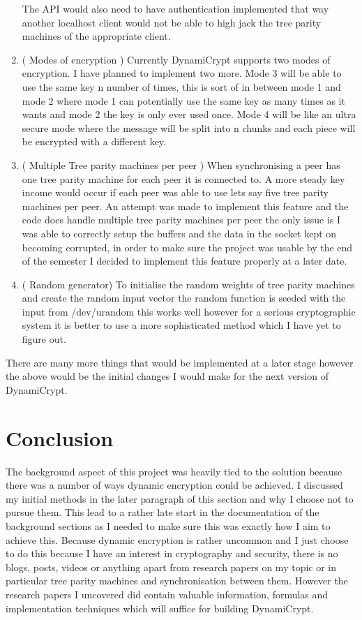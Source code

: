 \begin{enumerate}
	The API would also need to have authentication implemented that way another localhost client would not be able to high jack the tree parity machines of the appropriate client.
	\item ( Modes of encryption ) Currently DynamiCrypt supports two modes of encryption. I have planned to implement two more. Mode 3 will be able to use the same key n number of times, this is sort of in between mode 1 and mode 2 where mode 1 can potentially use the same key as many times as it wants and mode 2 the key is only ever used once. Mode 4 will be like an ultra secure mode where the message will be split into n chunks and each piece will be encrypted with a different key.
	\item ( Multiple Tree parity machines per peer ) When synchronising a peer has one tree parity machine for each peer it is connected to. A more steady key income would occur if each peer was able to use lets say five tree parity machines per peer. An attempt was made to implement this feature and the code does handle multiple tree parity machines per peer the only issue is I was able to correctly setup the buffers and the data in the socket kept on becoming corrupted, in order to make sure the project was usable by the end of the semester I decided to implement this feature properly at a later date. 
	\item ( Random generator) To initialise the random weights of tree parity machines and create the random input vector the random function is seeded with the input from /dev/urandom this works well however for a serious cryptographic system it is better to use a more sophisticated method which I have yet to figure out.
\end{enumerate}
	There are many more things that would be implemented at a later stage however the above would be the initial changes I would make for the next version of DynamiCrypt.
	
\section{Conclusion}
The background aspect of this project was heavily tied to the solution because there was a number of ways dynamic encryption could be achieved. I discussed my initial methods in the later paragraph of this section and why I choose not to pursue them. This lead to a rather late start in the documentation of the background sections as I needed to make sure this was exactly how I aim to achieve this. Because dynamic encryption is rather uncommon and I just choose to do this because I have an interest in cryptography and security, there is no blogs, posts, videos or anything apart from research papers on my topic or in particular tree parity machines and synchronisation between them. However the research papers I uncovered did contain valuable information, formulas and implementation techniques which will suffice for building DynamiCrypt.

